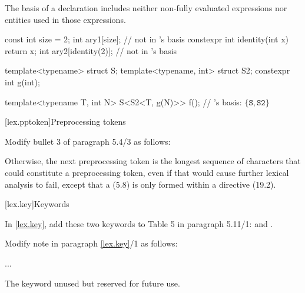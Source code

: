 \begin{undecided}
\begin{std.txt}

\alinea
\enternote
The basis of a declaration includes neither non-fully evaluated expressions nor
entities used in those expressions.
\begin{example}
   \begin{codeblock}
    const int size = 2;
    int ary1[size];                         //  not in 's basis
    constexpr int identity(int x) { return x; }
    int ary2[identity(2)];                  //  not in 's basis

    template<typename> struct S;
    template<typename, int> struct S2;
    constexpr int g(int);

    template<typename T, int N>
    S<S2<T, g(N)>> f();                     // 's basis: $\{ \mathtt{S}, \mathtt{S2} \}$ 
   \end{codeblock}
\end{example}
\exitnote

\end{std.txt}
\end{undecided}

\begin{after}
\setcounter{section}{3}
[lex.pptoken]{Preprocessing tokens}

Modify bullet 3 of paragraph 5.4/3 as follows:

\begin{std.txt}
Otherwise, the next preprocessing token is
the longest sequence of characters
that could constitute a preprocessing token,
even if that would cause further lexical analysis to fail,
except that a  (5.8)
is only formed
within a  directive (19.2).
\end{std.txt}
\end{after}

\begin{extract*}
\setcounter{section}{10}
[lex.key]{Keywords}

In \ref{lex.key}, add these two keywords to Table 5 in paragraph
5.11/1:  and .

\noindent
Modify note in paragraph \ref{lex.key}/1 as follows:
\begin{std.txt}
    \resetalinea[0]
    \alinea
    ...


    \enternote
    The   keyword 
    unused but   
    reserved for future use.
    \exitnote
\end{std.txt}
\end{extract*}

